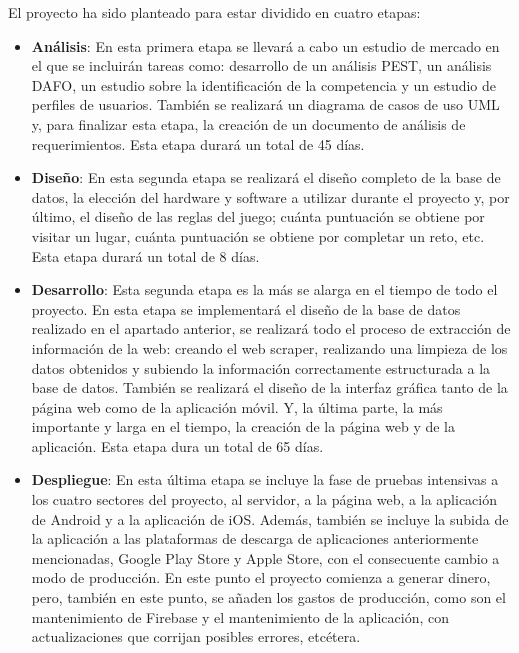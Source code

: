 El proyecto ha sido planteado para estar dividido en cuatro etapas:
\begin{itemize}
\item \textbf{Análisis}: En esta primera etapa se llevará a cabo un estudio de mercado en el que se incluirán tareas como: desarrollo de un análisis PEST, un análisis DAFO, un estudio sobre la identificación de la competencia y un estudio de perfiles de usuarios. También se realizará un diagrama de casos de uso UML y, para finalizar esta etapa, la creación de un documento de análisis de requerimientos. Esta etapa durará un total de 45 días.

\item \textbf{Diseño}: En esta segunda etapa se realizará el diseño completo de la base de datos, la elección del hardware y software a utilizar durante el proyecto y, por último, el diseño de las reglas del juego; cuánta puntuación se obtiene por visitar un lugar, cuánta puntuación se obtiene  por completar un reto, etc. Esta etapa durará un total de 8 días.

\item \textbf{Desarrollo}: Esta segunda etapa es la más se alarga en el tiempo de todo el proyecto. En esta etapa se implementará el diseño de la base de datos realizado en el apartado anterior, se realizará todo el proceso de extracción de información de la web: creando el web scraper, realizando una limpieza de los datos obtenidos y subiendo la información correctamente estructurada a la base de datos. También se realizará el diseño de la interfaz gráfica tanto de la página web como de la aplicación móvil. Y, la última parte, la más importante y larga en el tiempo, la creación de la página web y de la aplicación. Esta etapa dura un total de 65 días.

\item \textbf{Despliegue}: En esta última etapa se incluye la fase de pruebas intensivas a los cuatro sectores del proyecto, al servidor, a la página web, a la aplicación de Android y a la aplicación de iOS. Además, también se incluye la subida de la aplicación a las plataformas de descarga de aplicaciones anteriormente mencionadas, Google Play Store  y Apple Store, con el consecuente cambio a modo de producción. En este punto el proyecto comienza a generar dinero, pero, también en este punto, se añaden los gastos de producción, como son el mantenimiento de Firebase y el mantenimiento de la aplicación, con actualizaciones que corrijan posibles errores, etcétera.
\end{itemize}

